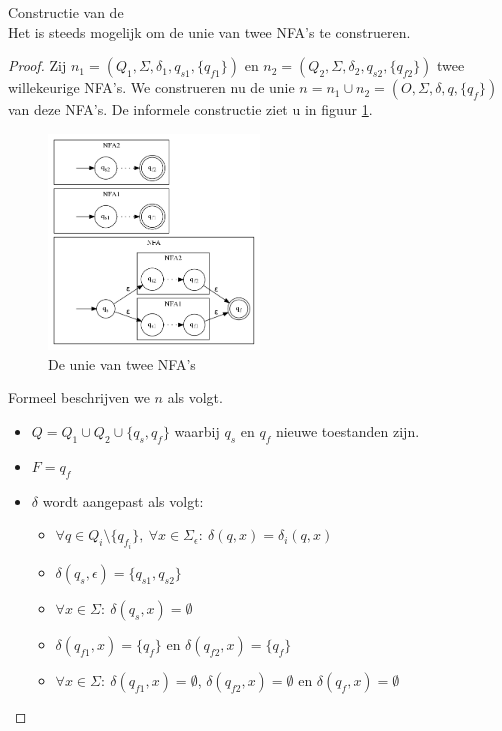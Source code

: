 \documentclass[main.tex]{subfiles}
\begin{document}
\begin{st}
  Constructie van de \\
  Het is steeds mogelijk om de unie van twee NFA's te construeren.

  \begin{proof}
    Zij $n_{1} = (Q_{1},\Sigma,\delta_{1},q_{s1},\{q_{f1}\})$ en $n_{2} = (Q_{2},\Sigma,\delta_{2},q_{s2},\{q_{f2}\})$ twee willekeurige NFA's. We construeren nu de unie $n = n_{1} \cup n_{2} = (O,\Sigma,\delta,q,\{q_{f}\})$ van deze NFA's.
    De informele constructie ziet u in figuur \ref{fig:nfa_unie}.
    \begin{figure}[H]
      \centering
      \includegraphics[width=0.5\textwidth]{assets/nfa_unie.png}      
      \caption{De unie van twee NFA's}
      \label{fig:nfa_unie}
    \end{figure}
    Formeel beschrijven we $n$ als volgt.
    \begin{itemize}
    \item $Q = Q_{1} \cup Q_{2} \cup \{ q_{s}, q_{f} \}$ waarbij $q_{s}$ en $q_{f}$ nieuwe toestanden zijn.
    \item $F = {q_{f}}$
    \item $\delta$ wordt aangepast als volgt:
      \begin{itemize}
      \item $\forall q \in Q_{i}\setminus\{q_{f_{i}}\},\ \forall x \in \Sigma_{\epsilon}:\ \delta(q,x) = \delta_{i}(q,x)$
      \item $\delta(q_{s},\epsilon) = \{q_{s1},q_{s2}\}$
      \item $\forall x \in \Sigma:\ \delta(q_{s},x) = \emptyset$
      \item $\delta(q_{f1},x) = \{q_{f}\}$ en $\delta(q_{f2},x) = \{q_{f}\}$
      \item $\forall x \in \Sigma:\ \delta(q_{f1},x) = \emptyset$, $\delta(q_{f2},x) = \emptyset$ en $\delta(q_{f},x) = \emptyset$ 
      \end{itemize}
    \end{itemize}
  \end{proof}
\end{st}
\end{document}
